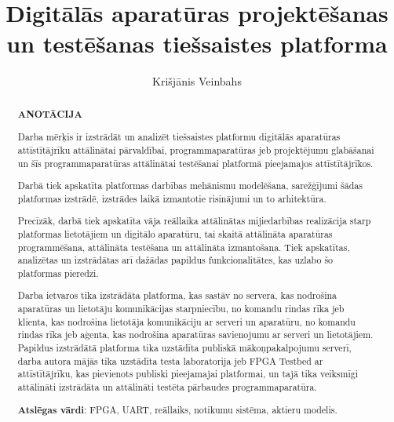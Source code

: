 \documentclass{LU}
\title{Digitālās aparatūras projektēšanas un testēšanas tiešsaistes platforma}
\author{Krišjānis Veinbahs}
\begin{document}
\maketitle

\renewcommand{\abstractname}{}
\begin{abstract}
    \begin{center}
    \Large\textbf{ANOTĀCIJA}\\
    \end{center}
    \vspace{1.5\baselineskip}

    Darba mērķis ir izstrādāt un analizēt tiešsaistes platformu digitālās
    aparatūras attīstītājrīku attālinātai pārvaldībai, programmaparatūras jeb
    projektējumu glabāšanai un šīs programmaparatūras attālinātai testēšanai
    platformā pieejamajos attīstītājrīkos.

    Darbā tiek apskatīta platformas darbības mehānismu modelēšana, sarežģījumi
    šādas platformas izstrādē, izstrādes laikā izmantotie risinājumi un to
    arhitektūra.

    Precīzāk, darbā tiek apskatīta vāja reāllaika attālinātas mijiedarbības
    realizācija starp platformas lietotājiem un digitālo aparatūru, tai skaitā
    attālināta aparatūras programmēšana, attālināta testēšana un attālināta
    izmantošana. Tiek apskatītas, analizētas un izstrādātas arī dažādas papildus
    funkcionalitātes, kas uzlabo šo platformas pieredzi.

    Darba ietvaros tika izstrādāta platforma, kas sastāv no servera, kas
    nodrošina aparatūras un lietotāju komunikācijas starpniecību, no komandu
    rindas rīka jeb klienta, kas nodrošina lietotāja komunikāciju ar serveri un
    aparatūru, no komandu rindas rīka jeb aģenta, kas nodrošina aparatūras
    savienojumu ar serveri un lietotājiem. Papildus izstrādātā platforma tika
    uzstādīta publiskā mākoņpakalpojumu serverī, darba autora mājās tika
    uzstādīta testa laboratorija jeb FPGA Testbed ar attīstītājrīku, kas
    pievienots publiski pieejamajai platformai, un tajā tika veiksmīgi
    attālināti izstrādāta un attālināti testēta pārbaudes programmaparatūra.

    \textbf{Atslēgas vārdi}: FPGA, UART, reāllaiks, notikumu sistēma, aktieru modelis.
\end{abstract}
 
\end{document}
